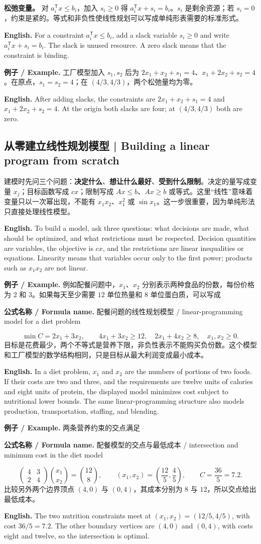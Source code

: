 \documentclass[UTF8,11pt,a4paper]{ctexart}
\newcommand{\EN}[1]{\par\noindent \textbf{English.} #1\par}
\newcommand{\FORMULA}[2]{\par\noindent\textbf{公式名称 / Formula name.} #1 / #2\par}
\newcommand{\EX}[2]{\par\noindent \textbf{例子 / Example.} #1\par\EN{#2}}
\begin{document}
\noindent\textbf{松弛变量。} 对 $a_i^{\mathsf T}x\le b_i$，加入 $s_i\ge0$ 得 $a_i^{\mathsf T}x+s_i=b_i$。$s_i$ 是剩余资源；若 $s_i=0$，约束是紧的。等式和非负性使线性规划可以写成单纯形表需要的标准形式。
\EN{For a constraint $a_i^{\mathsf T}x\le b_i$, add a slack variable $s_i\ge0$ and write $a_i^{\mathsf T}x+s_i=b_i$. The slack is unused resource. A zero slack means that the constraint is binding.}
\EX{工厂模型加入 $s_1,s_2$ 后为 $2x_1+x_2+s_1=4$、$x_1+2x_2+s_2=4$。在原点，$s_1=s_2=4$；在 $(4/3,4/3)$，两个松弛量均为零。}{After adding slacks, the constraints are $2x_1+x_2+s_1=4$ and $x_1+2x_2+s_2=4$. At the origin both slacks are four; at $(4/3,4/3)$ both are zero.}

\subsection{从零建立线性规划模型 | Building a linear program from scratch}
\noindent 建模时先问三个问题：\textbf{决定什么}、\textbf{想让什么最好}、\textbf{受到什么限制}。决定的量写成变量 $x_j$；目标函数写成 $cx$；限制写成 $Ax\le b$、$Ax\ge b$ 或等式。这里“线性”意味着变量只以一次幂出现，不能有 $x_1x_2$、$x_1^2$ 或 $\sin x_1$。这一步很重要，因为单纯形法只直接处理线性模型。
\EN{To build a model, ask three questions: what decisions are made, what should be optimized, and what restrictions must be respected. Decision quantities are variables, the objective is $cx$, and the restrictions are linear inequalities or equations. Linearity means that variables occur only to the first power; products such as $x_1x_2$ are not linear.}

\EX{例如配餐问题中，$x_1$、$x_2$ 分别表示两种食品的份数，每份价格为 $2$ 和 $3$。如果每天至少需要 $12$ 单位热量和 $8$ 单位蛋白质，可以写成
\FORMULA{配餐问题的线性规划模型}{linear-programming model for a diet problem}
\[
\min C=2x_1+3x_2,\qquad
4x_1+3x_2\ge12,\quad 2x_1+4x_2\ge8,\quad x_1,x_2\ge0.
\]
目标是花费最少，两个不等式是营养下限，非负性表示不能购买负份数。这个模型和工厂模型的数学结构相同，只是目标从最大利润变成最小成本。}{In a diet problem, $x_1$ and $x_2$ are the numbers of portions of two foods. If their costs are two and three, and the requirements are twelve units of calories and eight units of protein, the displayed model minimizes cost subject to nutritional lower bounds. The same linear-programming structure also models production, transportation, staffing, and blending.}

\EX{两条营养约束的交点满足
\FORMULA{配餐模型的交点与最低成本}{intersection and minimum cost in the diet model}
\[
\begin{pmatrix}4&3\\2&4\end{pmatrix}
\binom{x_1}{x_2}=\binom{12}{8},
\qquad (x_1,x_2)=\left(\frac{12}{5},\frac45\right),
\qquad C=\frac{36}{5}=7.2.
\]
比较另外两个边界顶点 $(4,0)$ 与 $(0,4)$，其成本分别为 $8$ 与 $12$，所以交点给出最低成本。}{The two nutrition constraints meet at $(x_1,x_2)=(12/5,4/5)$, with cost $36/5=7.2$. The other boundary vertices are $(4,0)$ and $(0,4)$, with costs eight and twelve, so the intersection is optimal.}
\end{document}

